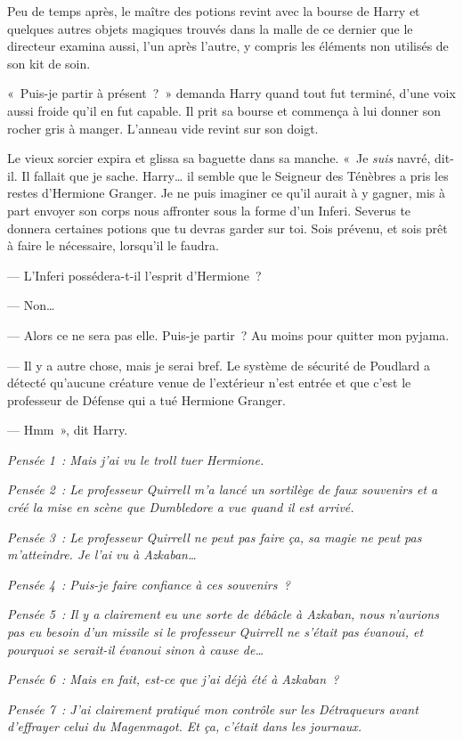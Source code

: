 Peu de temps après, le maître des potions revint avec la bourse de Harry et quelques autres objets magiques trouvés dans la malle de ce dernier que le directeur examina aussi, l'un après l'autre, y compris les éléments non utilisés de son kit de soin.

«~Puis-je partir à présent~?~» demanda Harry quand tout fut terminé, d'une voix aussi froide qu'il en fut capable. Il prit sa bourse et commença à lui donner son rocher gris à manger. L'anneau vide revint sur son doigt.

Le vieux sorcier expira et glissa sa baguette dans sa manche. «~Je \emph{suis} navré, dit-il. Il fallait que je sache. Harry… il semble que le Seigneur des Ténèbres a pris les restes d'Hermione Granger. Je ne puis imaginer ce qu'il aurait à y gagner, mis à part envoyer son corps nous affronter sous la forme d'un Inferi. Severus te donnera certaines potions que tu devras garder sur toi. Sois prévenu, et sois prêt à faire le nécessaire, lorsqu'il le faudra.

--- L'Inferi possédera-t-il l'esprit d'Hermione~?

--- Non…

--- Alors ce ne sera pas elle. Puis-je partir~? Au moins pour quitter mon pyjama.

--- Il y a autre chose, mais je serai bref. Le système de sécurité de Poudlard a détecté qu'aucune créature venue de l'extérieur n'est entrée et que c'est le professeur de Défense qui a tué Hermione Granger.

--- Hmm~», dit Harry.

\emph{Pensée 1~: Mais j'ai vu le troll tuer Hermione.}

\emph{Pensée 2~: Le professeur Quirrell m'a lancé un sortilège de faux souvenirs et a créé la mise en scène que Dumbledore a vue quand il est arrivé.}

\emph{Pensée 3~: Le professeur Quirrell ne peut pas faire ça, sa magie ne peut pas m'atteindre. Je l'ai vu à Azkaban…}

\emph{Pensée 4~: Puis-je faire confiance à ces souvenirs~?}

\emph{Pensée 5~: Il y a clairement eu une sorte de débâcle à Azkaban, nous n'aurions pas eu besoin d'un missile si le professeur Quirrell ne s'était pas évanoui, et pourquoi se serait-il évanoui sinon à cause de…}

\emph{Pensée 6~: Mais en fait, est-ce que j'ai déjà été à Azkaban~?}

\emph{Pensée 7~: J'ai clairement pratiqué mon contrôle sur les Détraqueurs avant d'effrayer celui du Magenmagot. Et \emph{ça}, c'était dans les journaux.}

